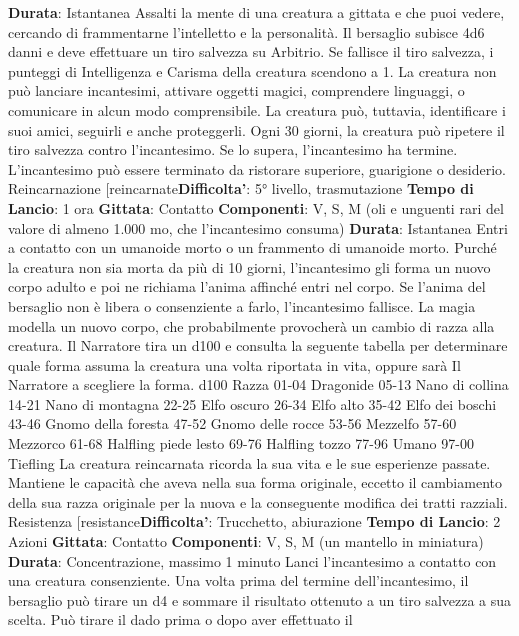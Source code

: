 \begin{multicols}{2}
\textbf{Durata}: Istantanea
Assalti la mente di una creatura a gittata e che puoi
vedere, cercando di frammentarne l’intelletto e la
personalità. Il bersaglio subisce 4d6 danni e
deve effettuare un tiro salvezza su Arbitrio.
Se fallisce il tiro salvezza, i punteggi di Intelligenza e
Carisma della creatura scendono a 1. La creatura non
può lanciare incantesimi, attivare oggetti magici,
comprendere linguaggi, o comunicare in alcun modo
comprensibile. La creatura può, tuttavia, identificare i
suoi amici, seguirli e anche proteggerli.
Ogni 30 giorni, la creatura può ripetere il tiro salvezza
contro l’incantesimo. Se lo supera, l’incantesimo ha
termine.
L’incantesimo può essere terminato da ristorare
superiore, guarigione o desiderio.
Reincarnazione
[reincarnate\textbf{Difficolta'}:
5° livello, trasmutazione
\textbf{Tempo di Lancio}: 1 ora
\textbf{Gittata}: Contatto
\textbf{Componenti}: V, S, M (oli e unguenti rari del valore di
almeno 1.000 mo, che l’incantesimo consuma)
\textbf{Durata}: Istantanea
Entri a contatto con un umanoide morto o un frammento
di umanoide morto. Purché la creatura non sia morta da
più di 10 giorni, l’incantesimo gli forma un nuovo corpo
adulto e poi ne richiama l’anima affinché entri nel corpo.
Se l’anima del bersaglio non è libera o consenziente a
farlo, l’incantesimo fallisce.
La magia modella un nuovo corpo, che probabilmente
provocherà un cambio di razza alla creatura. Il Narratore tira
un d100 e consulta la seguente tabella per determinare
quale forma assuma la creatura una volta riportata in
vita, oppure sarà Il Narratore a scegliere la forma.
d100 Razza
01-04 Dragonide
05-13 Nano di collina
14-21 Nano di montagna
22-25 Elfo oscuro
26-34 Elfo alto
35-42 Elfo dei boschi
43-46 Gnomo della foresta
47-52 Gnomo delle rocce
53-56 Mezzelfo
57-60 Mezzorco
61-68 Halfling piede lesto
69-76 Halfling tozzo
77-96 Umano
97-00 Tiefling
La creatura reincarnata ricorda la sua vita e le sue
esperienze passate. Mantiene le capacità che aveva
nella sua forma originale, eccetto il cambiamento della
sua razza originale per la nuova e la conseguente
modifica dei tratti razziali.
Resistenza
[resistance\textbf{Difficolta'}:
Trucchetto, abiurazione
\textbf{Tempo di Lancio}: 2 Azioni
\textbf{Gittata}: Contatto
\textbf{Componenti}: V, S, M (un mantello in miniatura)
\textbf{Durata}: Concentrazione, massimo 1 minuto
Lanci l’incantesimo a contatto con una creatura
consenziente. Una volta prima del termine
dell’incantesimo, il bersaglio può tirare un d4 e
sommare il risultato ottenuto a un tiro salvezza a sua
scelta. Può tirare il dado prima o dopo aver effettuato il

\end{multicols}
